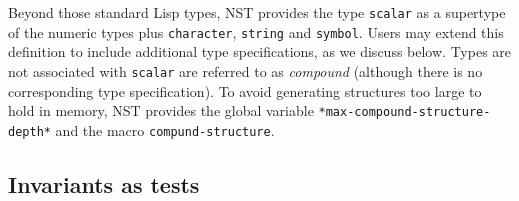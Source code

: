 Beyond those standard Lisp types, NST provides the type
\texttt{scalar} as a supertype of the numeric types plus
\texttt{character}, \texttt{string} and \texttt{symbol}.  Users may
extend this definition to include additional type specifications, as
we discuss below.  Types are not associated with \texttt{scalar} are
referred to as \emph{compound} (although there is no corresponding
type specification).  To avoid generating structures too large to hold
in memory, NST provides the global variable
\texttt{*max-compound-structure-depth*}\label{max-compound-structure-depth}
and the macro \texttt{compund-structure}.


\par


\subsection{Invariants as tests}
\label{sec:quickcheck-tests}


